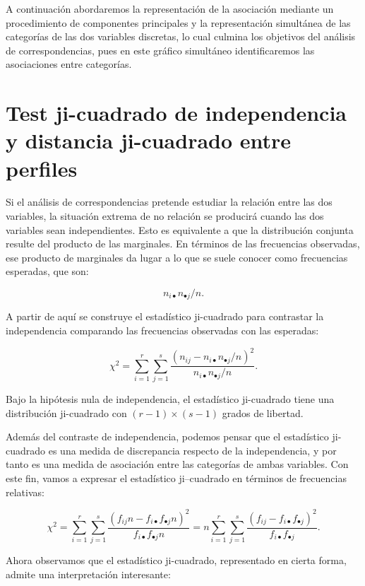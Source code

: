 \documentclass[
  a4paper,
  oneside]{scrbook}
\theoremstyle{definition}
\theoremstyle{definition}
\theoremstyle{definition}
\theoremstyle{definition}
\theoremstyle{remark}
\begin{document}
A continuación abordaremos la representación de la asociación
mediante un procedimiento de componentes principales y la representación simultánea de las categorías de las dos
variables discretas, lo cual culmina los objetivos del análisis de
correspondencias, pues en este gráfico simultáneo identificaremos las
asociaciones entre categorías.

\section{Test ji-cuadrado de independencia y distancia ji-cuadrado entre perfiles}\label{test-ji-cuadrado-de-independencia-y-distancia-ji-cuadrado-entre-perfiles}

Si el análisis de correspondencias pretende estudiar la relación entre
las dos variables, la situación extrema de no relación se producirá
cuando las dos variables sean independientes. Esto es equivalente a que
la distribución conjunta resulte del producto de las marginales. En
términos de las frecuencias observadas, ese producto de marginales da
lugar a lo que se suele conocer como frecuencias esperadas, que son:

\[n_{i\bullet}n_{\bullet j}/n.\]

A partir de aquí se construye el estadístico ji-cuadrado para contrastar
la independencia comparando las frecuencias observadas con las
esperadas:

\[\chi^2=\sum_{i=1}^r\sum_{j=1}^s
\frac{\left(n_{ij}-n_{i\bullet}n_{\bullet j}/n\right)^2}{n_{i\bullet}n_{\bullet j}/n}.\]

Bajo la hipótesis nula de independencia, el estadístico ji-cuadrado
tiene una distribución ji-cuadrado con \((r-1)\times (s-1)\) grados de
libertad.

Además del contraste de independencia, podemos pensar que el estadístico
ji-cuadrado es una medida de discrepancia respecto de la independencia,
y por tanto es una medida de asociación entre las categorías de ambas
variables. Con este fin, vamos a expresar el estadístico ji--cuadrado en
términos de frecuencias relativas:

\[\chi^2=\sum_{i=1}^r\sum_{j=1}^s
\frac{\left(f_{ij}n-f_{i\bullet}f_{\bullet j}n\right)^2}{f_{i\bullet}f_{\bullet j}n}
=n\sum_{i=1}^r\sum_{j=1}^s
\frac{\left(f_{ij}-f_{i\bullet}f_{\bullet j}\right)^2}{f_{i\bullet}f_{\bullet j}}.\]

Ahora observamos que el estadístico ji-cuadrado, representado en cierta
forma, admite una interpretación interesante:
\end{document}
